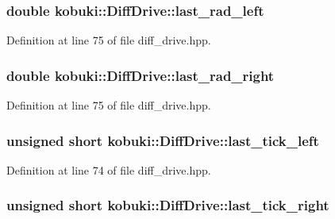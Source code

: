 \subsubsection[{last\-\_\-rad\-\_\-left}]{\setlength{\rightskip}{0pt plus 5cm}double {\bf kobuki\-::\-Diff\-Drive\-::last\-\_\-rad\-\_\-left}\hspace{0.3cm}{\ttfamily  [private]}}\label{classkobuki_1_1DiffDrive_a3a5f3a028bad67a5dac076e3fc9d8d22}


\-Definition at line 75 of file diff\-\_\-drive.\-hpp.

\subsubsection[{last\-\_\-rad\-\_\-right}]{\setlength{\rightskip}{0pt plus 5cm}double {\bf kobuki\-::\-Diff\-Drive\-::last\-\_\-rad\-\_\-right}\hspace{0.3cm}{\ttfamily  [private]}}\label{classkobuki_1_1DiffDrive_a799258e6537987af4f1e2a3d1750e9a3}


\-Definition at line 75 of file diff\-\_\-drive.\-hpp.

\subsubsection[{last\-\_\-tick\-\_\-left}]{\setlength{\rightskip}{0pt plus 5cm}unsigned short {\bf kobuki\-::\-Diff\-Drive\-::last\-\_\-tick\-\_\-left}\hspace{0.3cm}{\ttfamily  [private]}}\label{classkobuki_1_1DiffDrive_aae2baf5652d3cf5d17b9430df74460bc}


\-Definition at line 74 of file diff\-\_\-drive.\-hpp.

\subsubsection[{last\-\_\-tick\-\_\-right}]{\setlength{\rightskip}{0pt plus 5cm}unsigned short {\bf kobuki\-::\-Diff\-Drive\-::last\-\_\-tick\-\_\-right}\hspace{0.3cm}{\ttfamily  [private]}}\label{classkobuki_1_1DiffDrive_a5486e5f69560bf760c44893babcc03a4}


